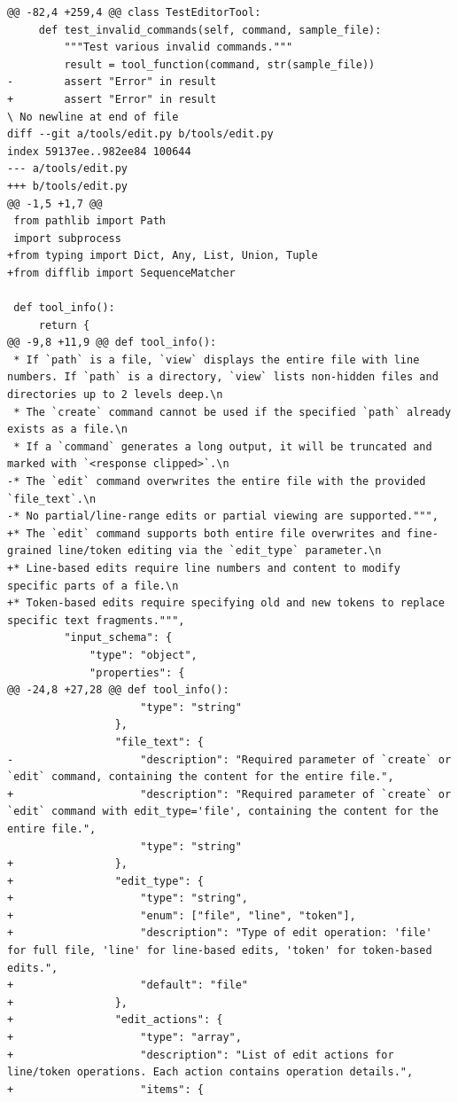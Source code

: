 \documentclass{article}
\begin{document}
\begin{lstlisting}[style=diffstyle]
@@ -82,4 +259,4 @@ class TestEditorTool:
     def test_invalid_commands(self, command, sample_file):
         """Test various invalid commands."""
         result = tool_function(command, str(sample_file))
-        assert "Error" in result
+        assert "Error" in result
\ No newline at end of file
diff --git a/tools/edit.py b/tools/edit.py
index 59137ee..982ee84 100644
--- a/tools/edit.py
+++ b/tools/edit.py
@@ -1,5 +1,7 @@
 from pathlib import Path
 import subprocess
+from typing import Dict, Any, List, Union, Tuple
+from difflib import SequenceMatcher
 
 def tool_info():
     return {
@@ -9,8 +11,9 @@ def tool_info():
 * If `path` is a file, `view` displays the entire file with line numbers. If `path` is a directory, `view` lists non-hidden files and directories up to 2 levels deep.\n
 * The `create` command cannot be used if the specified `path` already exists as a file.\n
 * If a `command` generates a long output, it will be truncated and marked with `<response clipped>`.\n
-* The `edit` command overwrites the entire file with the provided `file_text`.\n
-* No partial/line-range edits or partial viewing are supported.""",
+* The `edit` command supports both entire file overwrites and fine-grained line/token editing via the `edit_type` parameter.\n
+* Line-based edits require line numbers and content to modify specific parts of a file.\n
+* Token-based edits require specifying old and new tokens to replace specific text fragments.""",
         "input_schema": {
             "type": "object",
             "properties": {
@@ -24,8 +27,28 @@ def tool_info():
                     "type": "string"
                 },
                 "file_text": {
-                    "description": "Required parameter of `create` or `edit` command, containing the content for the entire file.",
+                    "description": "Required parameter of `create` or `edit` command with edit_type='file', containing the content for the entire file.",
                     "type": "string"
+                },
+                "edit_type": {
+                    "type": "string",
+                    "enum": ["file", "line", "token"],
+                    "description": "Type of edit operation: 'file' for full file, 'line' for line-based edits, 'token' for token-based edits.",
+                    "default": "file"
+                },
+                "edit_actions": {
+                    "type": "array",
+                    "description": "List of edit actions for line/token operations. Each action contains operation details.",
+                    "items": {

\end{lstlisting}
\end{document}
